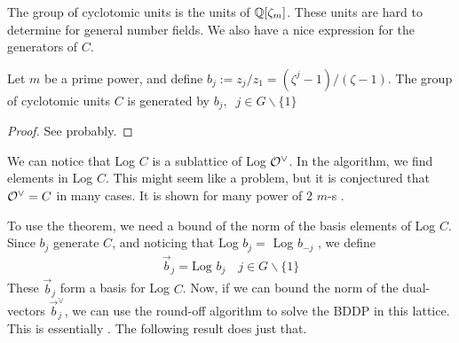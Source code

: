 The group of cyclotomic units is the units of \(\mathbb{Q}[\zeta_m]\). These units are hard to determine for general number fields\cite{Intro To Cyclotomic Fields}. We also have a nice expression for the generators of \(C\).
\begin{proposition}
Let \(m\) be a prime power, and define \(b_j := z_j/z_1 = (\zeta^j - 1)/(\zeta - 1)\). The group of cyclotomic units \(C\) is generated by \(b_j,\;\;j\in G\backslash \{1\}\)
\end{proposition}
\begin{proof}
See \cite{Intro To Cyclotomic Fields} probably. 
\end{proof}
We can notice that Log \(C\) is a sublattice of Log \(\mathcal{O}^\vee\). In the algorithm, we find elements in Log \(C\). This might seem like a problem, but it is conjectured that \(\mathcal{O}^\vee = C\) in many cases. It is shown for many power of 2 \(m\)-s .\par
To use the theorem, we need a bound of the norm of the basis elements of Log \(C\). Since \(b_j\) generate \(C\), and noticing that Log \(b_j = \) Log \(b_{-j}\) , we define
\begin{align*}
    \vec{b}_j = \text{Log }b_j\quad j\in G\backslash\{ 1\}
\end{align*}
These \(\vec{b}_j\) form a basis for Log \(C\). Now, if we can bound the norm of the dual-vectors \(\vec{b}_j^\vee\), we can use the round-off algorithm to solve the BDDP in this lattice. This is essentially \cite{Recover Short Gen}. The following result does just that.

